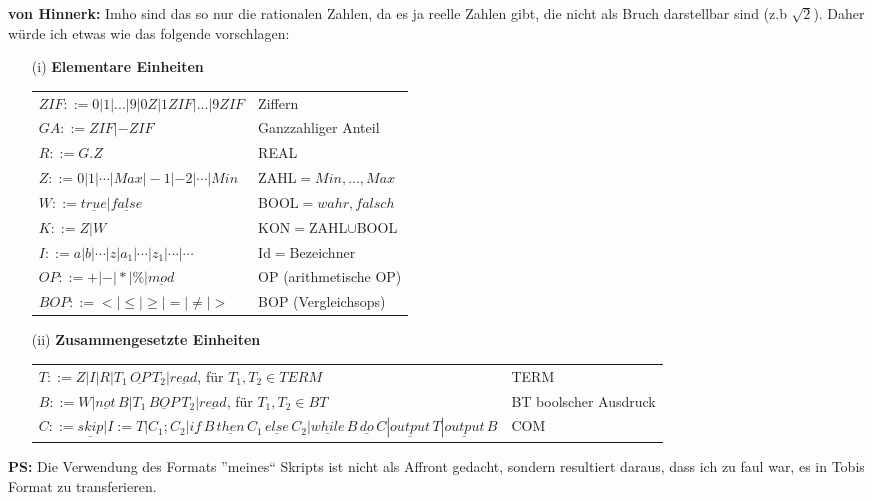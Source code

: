 \documentclass[ngerman,a4paper]{report}
\begin{document}
\textbf{von Hinnerk:}
Imho sind das so nur die rationalen Zahlen, da es ja reelle Zahlen gibt, die nicht als Bruch darstellbar sind (z.b $\sqrt{2}$).
Daher würde ich etwas wie das folgende vorschlagen:\\
\begin{itemize}
	\item[(i)] \textbf{Elementare Einheiten}\\
\begin{tabular}{l l}
			$ZIF::=0|1|...|9|0Z|1ZIF|...|9ZIF$ &Ziffern\\
			$GA::=ZIF|-ZIF$&Ganzzahliger Anteil\\
			$R::=G.Z$&REAL\\
			$Z::= 0|1|\cdots|Max|-1|-2|\cdots|Min$& ZAHL$={Min,...,Max}$\\
			$W::=\underline{true}|\underline{false}$& BOOL$={wahr,falsch}$\\
			$K::=Z|W$& KON$=$ZAHL$\cup$BOOL\\
			$I::=a|b|\cdots|z|a_1|\cdots|z_1|\cdots|\cdots$& Id$=$Bezeichner\\
			$OP::=+|-|*|\%|\underline{mod}$& OP (arithmetische OP) \\
			$BOP::=<|\leq|\geq|=|\neq|>$& BOP (Vergleichsops)\\
\end{tabular}
\item[(ii)]\textbf{Zusammengesetzte Einheiten}\\
	\begin{tabular}{l l}
		$T::=Z|I|R|T_1\, \underline{OP}\, T_2|\underline{read}$, für $T_1,T_2\in TERM$& TERM\\
		$B::=W|\underline{not} \,B|T_1\, \underline{BOP}\, T_2|\underline{read}$, für $T_1,T_2\in BT$& BT	boolscher Ausdruck\\
		$C::= \underline{skip}|I:=T|C_1;C_2|\underline{if}\,  B\, \underline{then}\,  C_1\,  \underline{else}\,  C_2|\underline{while}\, B\, \underline{do}\, C|\underline{output}\,  T|\underline{output}\,  B$& COM\\
\end{tabular}
\end{itemize}

\textbf{PS:} Die Verwendung des Formats ''meines`` Skripts ist nicht als Affront gedacht, sondern resultiert daraus, dass ich zu faul war, es in Tobis Format zu transferieren.
\end{document}
